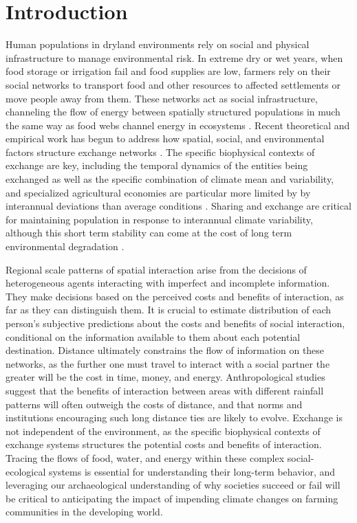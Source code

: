 \documentclass[10pt]{iopart}
\begin{document}
\section*{Introduction}
Human populations in dryland environments rely on social and physical infrastructure to manage environmental risk. In extreme dry or wet years, when food storage or irrigation fail and food supplies are low, farmers rely on their social networks to transport food and other resources to affected settlements or move people away from them. These networks act as social infrastructure, channeling the flow of energy between spatially structured populations in much the same way as food webs channel energy in ecosystems \parencite{Crabtree2017ReconstructingStates;Crabtree2015}. Recent theoretical and empirical work has begun to address how spatial, social, and environmental factors structure exchange networks \parencite{Nolin2010Food-SharingIndonesia,Koster2014,Hao2015,Schnegg2015}. The specific biophysical contexts of exchange are key, including the temporal dynamics of the entities being exchanged as well as the specific combination of climate mean and variability, and specialized agricultural economies are particular more limited by by interannual deviations than average conditions \parencite{Freeman2014}. Sharing and exchange are critical for maintaining population in response to interannual climate variability, although this short term stability can come at the cost of long term environmental degradation \parencite{Janssen2010}.

Regional scale patterns of spatial interaction arise from the decisions of heterogeneous agents interacting with imperfect and incomplete information. They make decisions based on the perceived costs and benefits of interaction, as far as they can distinguish them. It is crucial to estimate distribution of each person's subjective predictions about the costs and benefits of social interaction, conditional on the information available to them about each potential destination. Distance ultimately constrains the flow of information on these networks, as the further one must travel to interact with a social partner the greater will be the cost in time, money, and energy. Anthropological studies suggest that the benefits of interaction between areas with different rainfall patterns will often outweigh the costs of distance, and that norms and institutions encouraging such long distance ties are likely to evolve. Exchange is not independent of the environment, as the specific biophysical contexts of exchange systems structures the potential costs and benefits of interaction. Tracing the flows of food, water, and energy within these complex social-ecological systems is essential for understanding their long-term behavior, and leveraging our archaeological understanding of why societies succeed or fail will be critical to anticipating the impact of impending climate changes on farming communities in the developing world.
\end{document}

